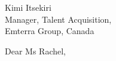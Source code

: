 \begin{flushleft}
Kimi Itsekiri \\
Manager, Talent Acquisition, \\
Emterra Group, Canada
\end{flushleft}

\vspace{1.0em}

Dear Ms Rachel,